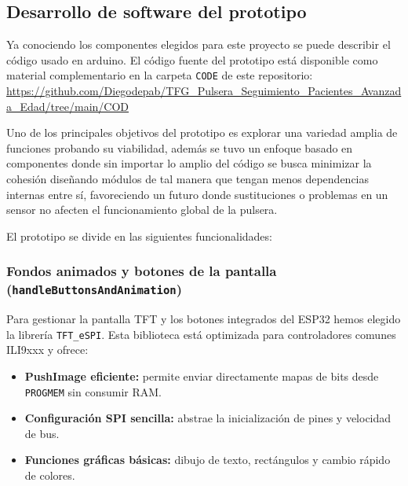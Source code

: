 \documentclass[12pt, a4paper]{article}
\begin{document}
	
	\subsection{Desarrollo de software del prototipo}
	
	Ya conociendo los componentes elegidos para este proyecto se puede describir el código usado en arduino. El código fuente del prototipo está disponible como material complementario en la carpeta \texttt{CODE} de este repositorio:  
	\url{https://github.com/Diegodepab/TFG_Pulsera_Seguimiento_Pacientes_Avanzada_Edad/tree/main/COD}
	
	Uno de los principales objetivos del prototipo es explorar una variedad amplia de funciones probando su viabilidad, además se tuvo un enfoque basado en componentes donde sin importar lo amplio del código se busca minimizar la cohesión diseñando módulos de tal manera que tengan menos dependencias internas entre sí, favoreciendo un futuro donde sustituciones o problemas en un sensor no afecten el funcionamiento global de la pulsera.
	
	El prototipo se divide en las siguientes funcionalidades:
	
	\subsubsection{Fondos animados y botones de la pantalla (\texttt{handleButtonsAndAnimation})}
	
	Para gestionar la pantalla TFT y los botones integrados del ESP32 hemos elegido la librería \texttt{TFT\_eSPI}. Esta biblioteca está optimizada para controladores comunes ILI9xxx y ofrece:
	\begin{itemize}
		\item \textbf{PushImage eficiente:} permite enviar directamente mapas de bits desde \texttt{PROGMEM} sin consumir RAM.  
		\item \textbf{Configuración SPI sencilla:} abstrae la inicialización de pines y velocidad de bus.  
		\item \textbf{Funciones gráficas básicas:} dibujo de texto, rectángulos y cambio rápido de colores.
	\end{itemize}
	
\end{document}
